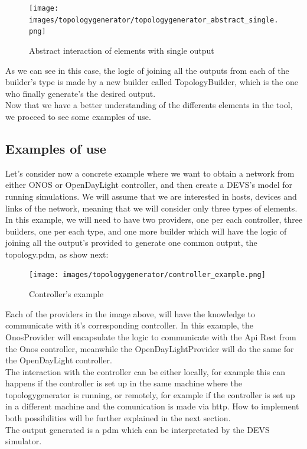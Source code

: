 \begin{figure}[H]
\centering
\texttt{[image: images/topologygenerator/topologygenerator\_abstract\_single.png]}
\caption{Abstract interaction of elements with single output}
\end{figure}

As we can see in this case, the logic of joining all the outputs from each of the builder's type is made by a new builder called TopologyBuilder, which is the one who finally generate's the desired output.\\

Now that we have a better understanding of the differents elements in the tool, we proceed to see some examples of use.

\subsection{Examples of use}

Let's consider now a concrete example where we want to obtain a network from either ONOS or OpenDayLight controller, and then create a DEVS's model for running simulations. We will assume that we are interested in hosts, devices and links of the network, meaning that we will consider only three types of elements. \\
In this example, we will need to have two providers, one per each controller, three builders, one per each type, and one more builder which will have the logic of joining all the output's provided to generate one common output, the topology.pdm, as show next:

\begin{figure}[H]
\centering
\texttt{[image: images/topologygenerator/controller\_example.png]}
\caption{Controller's example}
\end{figure}

Each of the providers in the image above, will have the knowledge to communicate with it's corresponding controller. In this example, the OnosProvider will encapsulate the logic to communicate with the Api Rest from the Onos controller, meanwhile the OpenDayLightProvider will do the same for the OpenDayLight controller.\\
The interaction with the controller can be either locally, for example this can happens if the controller is set up in the same machine where the topologygenerator is running, or remotely, for example if the controller is set up in a different machine and the comunication is made via http. How to implement both possibilities will be further explained in the next section.\\
The output generated is a pdm which can be interpretated by the DEVS simulator.\\

